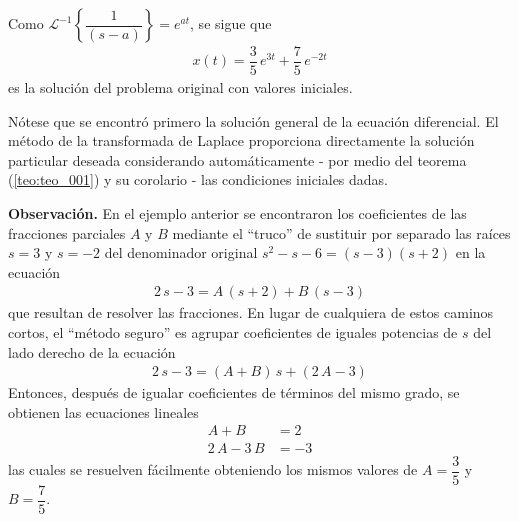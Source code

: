 Como $\mathscr{L}^{-1} \left\{ \dfrac{1}{(s-a)} \right\} = e^{a t}$, se sigue que
\begin{align*}
x(t) = \dfrac{3}{5} \, e^{3t} + \dfrac{7}{5} \, e^{-2t}
\end{align*}
es la solución del problema original con valores iniciales. 
\par
Nótese que se encontró primero la solución general de la ecuación diferencial. El método de la transformada de Laplace proporciona directamente la solución particular deseada considerando automáticamente  - por medio del teorema (\ref{teo:teo_001}) y su corolario - las condiciones iniciales dadas.
\par
\textbf{Observación. } En el ejemplo anterior se encontraron los coeficientes de las fracciones parciales $A$ y $B$ mediante el \enquote{truco} de sustituir por separado las raíces $s = 3$ y $s = -2$ del denominador original $s^{2} - s - 6 = (s - 3)(s + 2)$ en la ecuación
\begin{align*}
2 \, s - 3 =  A \, (s + 2) + B \, (s - 3)
\end{align*}
que resultan de resolver las fracciones. En lugar de cualquiera de estos caminos cortos, el \enquote{método seguro} es agrupar coeficientes de iguales potencias de $s$ del lado derecho de la ecuación
\begin{align*}
2 \, s - 3 = (A + B) \, s + (2 \, A - 3)
\end{align*}
Entonces, después de igualar coeficientes de términos del mismo grado, se obtienen las ecuaciones lineales
\begin{align*}
A + B &= 2 \\
2 \, A - 3 \, B &= -3
\end{align*}
las cuales se resuelven fácilmente obteniendo los mismos valores de $A = \dfrac{3}{5}$ y $B = \dfrac{7}{5}$.
